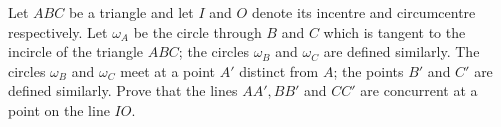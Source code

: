 Let $ABC$ be a triangle and let $I$ and $O$ denote its incentre and circumcentre respectively. Let $\omega_A$ be the circle through $B$ and $C$ which is tangent to the incircle of the triangle $ABC$; the circles $\omega_B$ and $\omega_C$ are defined similarly. The circles $\omega_B$ and $\omega_C$ meet at a point $A'$ distinct from $A$; the points $B'$ and $C'$ are defined similarly. Prove that the lines $AA',BB'$ and $CC'$ are concurrent at a point on the line $IO$.